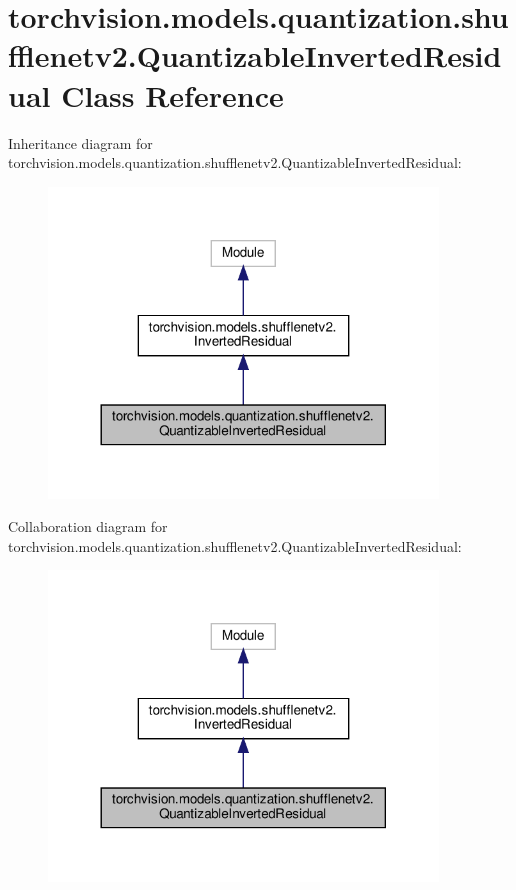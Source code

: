 \hypertarget{classtorchvision_1_1models_1_1quantization_1_1shufflenetv2_1_1QuantizableInvertedResidual}{}\section{torchvision.\+models.\+quantization.\+shufflenetv2.\+Quantizable\+Inverted\+Residual Class Reference}
\label{classtorchvision_1_1models_1_1quantization_1_1shufflenetv2_1_1QuantizableInvertedResidual}


Inheritance diagram for torchvision.\+models.\+quantization.\+shufflenetv2.\+Quantizable\+Inverted\+Residual\+:
\nopagebreak
\begin{figure}[H]
\begin{center}
\leavevmode
\includegraphics[width=293pt]{classtorchvision_1_1models_1_1quantization_1_1shufflenetv2_1_1QuantizableInvertedResidual__inherit__graph}
\end{center}
\end{figure}


Collaboration diagram for torchvision.\+models.\+quantization.\+shufflenetv2.\+Quantizable\+Inverted\+Residual\+:
\nopagebreak
\begin{figure}[H]
\begin{center}
\leavevmode
\includegraphics[width=293pt]{classtorchvision_1_1models_1_1quantization_1_1shufflenetv2_1_1QuantizableInvertedResidual__coll__graph}
\end{center}
\end{figure}
